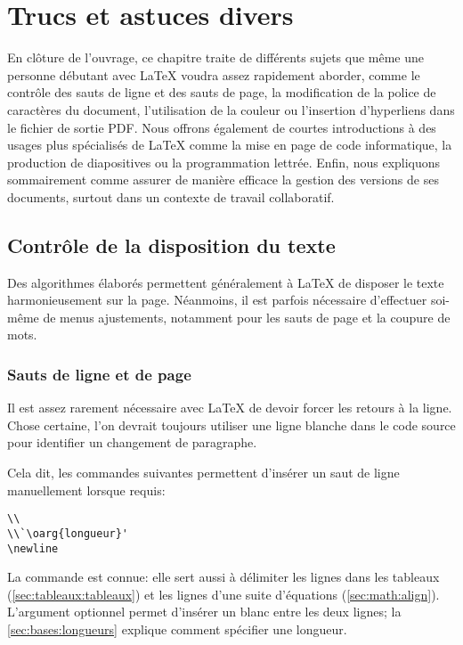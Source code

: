 \chapter{Trucs et astuces divers}
\label{chap:trucs}

En clôture de l'ouvrage, ce chapitre traite de différents sujets que
même une personne débutant avec {\LaTeX} voudra assez rapidement
aborder, comme le contrôle des sauts de ligne et des sauts de page, la
modification de la police de caractères du document, l'utilisation de
la couleur ou l'insertion d'hyperliens dans le fichier de sortie PDF.
Nous offrons également de courtes introductions à des usages plus
spécialisés de {\LaTeX} comme la mise en page de code informatique, la
production de diapositives ou la programmation lettrée. Enfin, nous
expliquons sommairement comme assurer de manière efficace la gestion
des versions de ses documents, surtout dans un contexte de travail
collaboratif.

\section{Contrôle de la disposition du texte}
\label{sec:trucs:controle}

Des algorithmes élaborés permettent généralement à {\LaTeX} de
disposer le texte harmonieusement sur la page. Néanmoins, il
est parfois nécessaire  d'effectuer soi-même de menus ajustements,
notamment pour les sauts de page et la coupure de mots.

\subsection{Sauts de ligne et de page}
\label{sec:trucs:controle:sauts}

Il est assez rarement nécessaire avec {\LaTeX} de devoir forcer les
retours à la ligne. Chose certaine, l'on devrait toujours utiliser une
ligne blanche dans le code source pour identifier un changement de
paragraphe.

Cela dit, les commandes suivantes permettent d'insérer un saut de
ligne manuellement lorsque requis:
\begin{lstlisting}
\\
\\`\oarg{longueur}'
\newline
\end{lstlisting}
La commande {\pixbsbs} est connue: elle sert aussi à délimiter les
lignes dans les tableaux (\autoref{sec:tableaux:tableaux}) et les lignes
d'une suite d'équations (\autoref{sec:math:align}). L'argument optionnel
 permet d'insérer un blanc entre les deux lignes; la
\autoref{sec:bases:longueurs} explique comment spécifier une
longueur.

